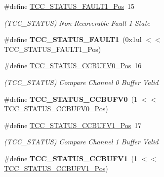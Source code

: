 \begin{DoxyCompactItemize}
\item 
\hypertarget{group___s_a_m_l21___t_c_c_ga9651bada23e0acd17515905c37484e7b}{}\#define \hyperlink{group___s_a_m_l21___t_c_c_ga9651bada23e0acd17515905c37484e7b}{T\+C\+C\+\_\+\+S\+T\+A\+T\+U\+S\+\_\+\+F\+A\+U\+L\+T1\+\_\+\+Pos}~15\label{group___s_a_m_l21___t_c_c_ga9651bada23e0acd17515905c37484e7b}

\begin{DoxyCompactList}\small\item\em (T\+C\+C\+\_\+\+S\+T\+A\+T\+U\+S) Non-\/\+Recoverable Fault 1 State \end{DoxyCompactList}\item 
\hypertarget{group___s_a_m_l21___t_c_c_ga71674c4f42fb6301f999dc31870047fc}{}\#define {\bfseries T\+C\+C\+\_\+\+S\+T\+A\+T\+U\+S\+\_\+\+F\+A\+U\+L\+T1}~(0x1ul $<$$<$ T\+C\+C\+\_\+\+S\+T\+A\+T\+U\+S\+\_\+\+F\+A\+U\+L\+T1\+\_\+\+Pos)\label{group___s_a_m_l21___t_c_c_ga71674c4f42fb6301f999dc31870047fc}

\item 
\hypertarget{group___s_a_m_l21___t_c_c_ga4135faa2482b5a12f71dd55884225650}{}\#define \hyperlink{group___s_a_m_l21___t_c_c_ga4135faa2482b5a12f71dd55884225650}{T\+C\+C\+\_\+\+S\+T\+A\+T\+U\+S\+\_\+\+C\+C\+B\+U\+F\+V0\+\_\+\+Pos}~16\label{group___s_a_m_l21___t_c_c_ga4135faa2482b5a12f71dd55884225650}

\begin{DoxyCompactList}\small\item\em (T\+C\+C\+\_\+\+S\+T\+A\+T\+U\+S) Compare Channel 0 Buffer Valid \end{DoxyCompactList}\item 
\hypertarget{group___s_a_m_l21___t_c_c_ga76213ac630a9a5281faef0f86538e972}{}\#define {\bfseries T\+C\+C\+\_\+\+S\+T\+A\+T\+U\+S\+\_\+\+C\+C\+B\+U\+F\+V0}~(1 $<$$<$ \hyperlink{group___s_a_m_l21___t_c_c_ga4135faa2482b5a12f71dd55884225650}{T\+C\+C\+\_\+\+S\+T\+A\+T\+U\+S\+\_\+\+C\+C\+B\+U\+F\+V0\+\_\+\+Pos})\label{group___s_a_m_l21___t_c_c_ga76213ac630a9a5281faef0f86538e972}

\item 
\hypertarget{group___s_a_m_l21___t_c_c_gade35abd3667774677b42e3bbce210842}{}\#define \hyperlink{group___s_a_m_l21___t_c_c_gade35abd3667774677b42e3bbce210842}{T\+C\+C\+\_\+\+S\+T\+A\+T\+U\+S\+\_\+\+C\+C\+B\+U\+F\+V1\+\_\+\+Pos}~17\label{group___s_a_m_l21___t_c_c_gade35abd3667774677b42e3bbce210842}

\begin{DoxyCompactList}\small\item\em (T\+C\+C\+\_\+\+S\+T\+A\+T\+U\+S) Compare Channel 1 Buffer Valid \end{DoxyCompactList}\item 
\hypertarget{group___s_a_m_l21___t_c_c_ga88e469a2dc96e8d4ce2a6ebadcab11c5}{}\#define {\bfseries T\+C\+C\+\_\+\+S\+T\+A\+T\+U\+S\+\_\+\+C\+C\+B\+U\+F\+V1}~(1 $<$$<$ \hyperlink{group___s_a_m_l21___t_c_c_gade35abd3667774677b42e3bbce210842}{T\+C\+C\+\_\+\+S\+T\+A\+T\+U\+S\+\_\+\+C\+C\+B\+U\+F\+V1\+\_\+\+Pos})\label{group___s_a_m_l21___t_c_c_ga88e469a2dc96e8d4ce2a6ebadcab11c5}


\end{DoxyCompactItemize}
